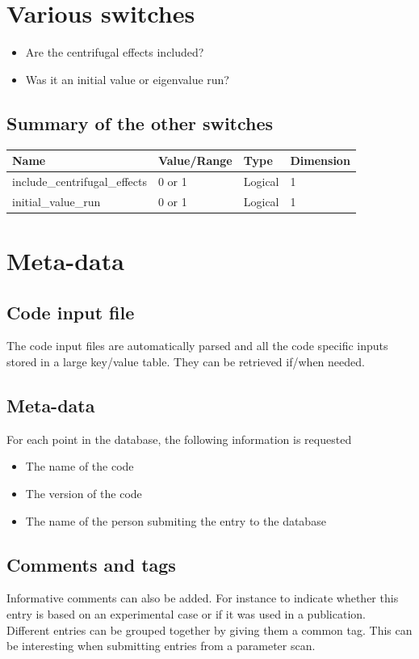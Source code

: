 \documentclass[a4paper]{report}
\begin{document}
\section{Various switches} \label{sec:rotswitches}
\begin{itemize}
\item Are the centrifugal effects included?  
\item Was it an initial value or eigenvalue run?
\end{itemize}

\subsection{Summary of the other switches}
\begin{tabularx}{\textwidth}{|X|Y|Y|Y|}
\hline
Name & Value/Range & Type & Dimension \\
\hline
include\_centrifugal\_effects &  0 or 1 & Logical & 1 \\
initial\_value\_run &  0 or 1 & Logical & 1 \\
\hline
\end{tabularx}

\section{Meta-data}

\subsection{Code input file}
The code input files are automatically parsed and all the code specific inputs stored in a large key/value table. They can be retrieved if/when needed.

\subsection{Meta-data}
For each point in the database, the following information is requested 
\begin{itemize}
 \item The name of the code 
 \item The version of the code
 \item The name of the person submiting the entry to the database
\end{itemize}

\subsection{Comments and tags}
Informative comments can also be added. For instance to indicate whether this entry is based on an experimental case or if it was used in a publication.\\
Different entries can be grouped together by giving them a common tag. This can be interesting when submitting entries from a parameter scan.
 
\end{document}
